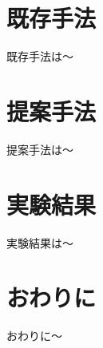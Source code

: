 \documentclass[a4paper,10pt,twocolumn]{jsarticle}
\begin{document}
\vspace{-1mm}
\section{既存手法}
\vspace{-1mm}
既存手法は～

\vspace{-1mm}
\section{提案手法} 
\vspace{-1mm}
提案手法は～

\vspace{-1mm}
\section{実験結果}
\vspace{-1mm}
実験結果は～

\vspace{-1mm}
\section{おわりに}
\vspace{-1mm}
おわりに～


\vspace{-1mm}

{\footnotesize
 
}
\end{document}

